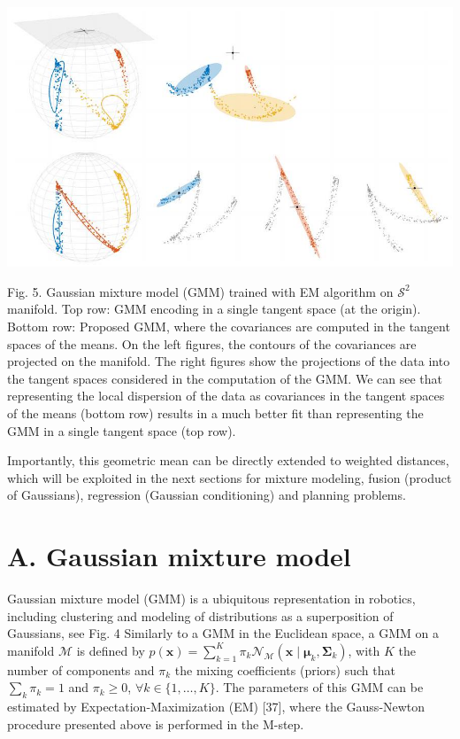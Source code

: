 \documentclass[10pt]{article}
\begin{document}
\begin{center}
\includegraphics[max width=\textwidth]{2023_01_25_b4240e152b7ba97a594cg-05(1)}
\end{center}

Fig. 5. Gaussian mixture model (GMM) trained with EM algorithm on $\mathcal{S}^{2}$ manifold. Top row: GMM encoding in a single tangent space (at the origin). Bottom row: Proposed GMM, where the covariances are computed in the tangent spaces of the means. On the left figures, the contours of the covariances are projected on the manifold. The right figures show the projections of the data into the tangent spaces considered in the computation of the GMM. We can see that representing the local dispersion of the data as covariances in the tangent spaces of the means (bottom row) results in a much better fit than representing the GMM in a single tangent space (top row).

Importantly, this geometric mean can be directly extended to weighted distances, which will be exploited in the next sections for mixture modeling, fusion (product of Gaussians), regression (Gaussian conditioning) and planning problems.

\section{A. Gaussian mixture model}
Gaussian mixture model (GMM) is a ubiquitous representation in robotics, including clustering and modeling of distributions as a superposition of Gaussians, see Fig. 4 Similarly to a GMM in the Euclidean space, a GMM on a manifold $\mathcal{M}$ is defined by $p(\boldsymbol{x})=\sum_{k=1}^{K} \pi_{k} \mathcal{N}_{\mathcal{M}}\left(\boldsymbol{x} \mid \boldsymbol{\mu}_{k}, \boldsymbol{\Sigma}_{k}\right)$, with $K$ the number of components and $\pi_{k}$ the mixing coefficients (priors) such that $\sum_{k} \pi_{k}=1$ and $\pi_{k} \geq 0$, $\forall k \in\{1, \ldots, K\}$. The parameters of this GMM can be estimated by Expectation-Maximization (EM) [37], where the Gauss-Newton procedure presented above is performed in the M-step.
\end{document}
